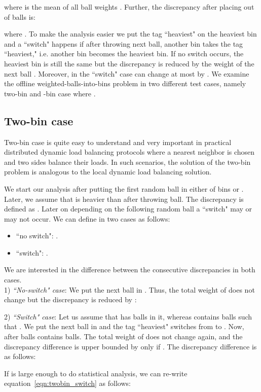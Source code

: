 \documentclass[12pt,psfig,a4]{article}
\theoremstyle{plain}
\begin{document}
where  is the mean of all ball weights . 
Further, the discrepancy after placing  out of  balls is:
 
where .
To make the analysis easier we put the tag ``heaviest" on the heaviest bin  and a ``switch" happens if after throwing next ball, another bin takes the tag ``heaviest," i.e. another bin becomes the heaviest bin. If no switch occurs, the heaviest bin is still the same but the discrepancy is reduced by the weight of the next ball . Moreover, in the ``switch" case  can change at most by . We examine the offline weighted-balls-into-bins problem in two different test cases, namely two-bin and -bin case where .

\subsection{Two-bin case}
Two-bin case is quite easy to understand and very important in practical distributed dynamic load balancing protocols where a nearest neighbor is chosen and two sides balance their loads. In such scenarios, the solution of the two-bin problem is analogous to the local dynamic load balancing solution.

We start our analysis after putting the first random ball in either of bins  or . Later, we assume that  is heavier than  after throwing  ball. The discrepancy is defined as . Later on depending on the following random ball  a ``switch" may or may not occur.  We can define  in two cases as follows:
\begin{itemize}
	\item ``no switch": .
	\item ``switch": .
\end{itemize} 

We are interested in the difference between the consecutive discrepancies  in both cases. \\
1) \textit{``No-switch" case}: We put the next ball  in . Thus, the total weight of  does not change but the discrepancy is reduced by :

2) \textit{``Switch" case}: Let us assume that  has  balls in it, whereas  contains  balls such that . We put the next ball  in  and the tag ``heaviest" switches from  to . Now, after  balls  contains  balls. The total weight of  does not change again,  and the discrepancy difference is upper bounded by  only if  . The discrepancy difference is as follows:


 If  is large enough to do statistical analysis, we can re-write equation~\ref{eqn:twobin_switch} as follows:
\end{document}
